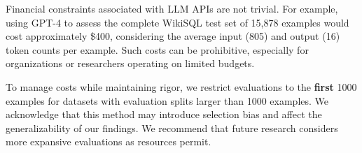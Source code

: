 Financial constraints associated with LLM APIs are not trivial. For example, using GPT-4 to assess the complete WikiSQL test set of 15,878 examples would cost approximately \$400, considering the average input (805) and output (16) token counts per example. Such costs can be prohibitive, especially for organizations or researchers operating on limited budgets.

To manage costs while maintaining rigor, we restrict evaluations to the \textbf{first} 1000 examples for datasets with evaluation splits larger than 1000 examples. We acknowledge that this method may introduce selection bias and affect the generalizability of our findings. We recommend that future research considers more expansive evaluations as resources permit.

